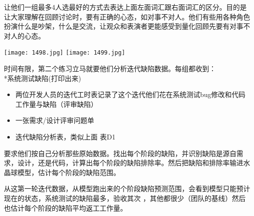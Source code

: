 让他们一组最多4人选最好的方式去表达上面左面词汇跟右面词汇的区分。目的是让大家理解在回顾讨论时，要有正确的心态，如对事不对人。他们有些用各种角色扮演什么是吵架，什么是交流，让观众和表演者更能感受到量化回顾先要有对事不对人的心态。

\texttt{[image: 1498.jpg]}
\texttt{[image: 1499.jpg]}

时间有限，第二个练习立马就要他们分析迭代缺陷数据。每组都收到：\\
*系统测试缺陷(打印出来)

\begin{itemize}
\tightlist
\item
  两位开发人员的迭代工时表记录了这个迭代他们花在系统测试bug修改和代码工作量与缺陷（评审缺陷）
\item
  一张需求/设计评审问题单
\item
  迭代缺陷分析表，类似上面 表D1
\end{itemize}

要求他们按自己分析那些原始数据。找出每个阶段的缺陷，并识别缺陷是源自需求，设计，还是代码，计算出每个阶段的缺陷排除率。然后把缺陷和排除率输进水晶球模型，估计每个阶段的缺陷范围。

从这第一轮迭代数据，从模型跑出来的个阶段缺陷预测范围，会看到模型只能预计现在的状态，系统测试的缺陷最多，验收其次
，其他都很少（团队的基线）然后也估计每个阶段的缺陷平均返工工作量。



